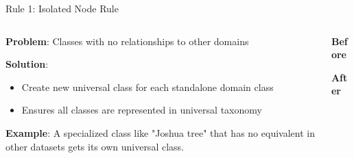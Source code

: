 \documentclass[aspectratio=169]{beamer}
\begin{document}
\begin{frame}{Rule 1: Isolated Node Rule}
    \begin{columns}[T]
        \begin{column}{0.55\textwidth}
            \textbf{Problem}: Classes with no relationships to other domains

            \vspace{0.5em}

            \textbf{Solution}:
            \begin{itemize}
                \item Create new universal class for each standalone domain class
                \item Ensures all classes are represented in universal taxonomy
            \end{itemize}

            \vspace{0.5em}

            \textbf{Example}: A specialized class like "Joshua tree" that has no equivalent in other datasets gets its own universal class.
        \end{column}

        \begin{column}{0.4\textwidth}
            \begin{center}
                \textbf{Before} \\
                \vspace{0.5em}

                \vspace{1em}

                \textbf{After} \\
                \vspace{0.5em}
            \end{center}
        \end{column}
    \end{columns}
\end{frame}
\end{document}
